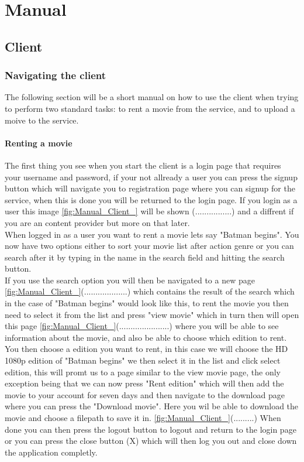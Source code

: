 \chapter{Manual}
\label{Manual}

\section{Client}
\label{Manual_Client}

\subsection{Navigating the client}
\label{Manual_Client_Navigation}
The following section will be a short manual on how to use the client when trying to perform two standard tasks: to rent a movie from the service, and to upload a moive to the service.

\subsubsection{Renting a movie}
\label{Manual_Client_Navigation_Rent}
The first thing you see when you start the client is a login page that requires your username and password, if your not allready a user you can press the signup button which will navigate you to registration page where you can signup for the service, when this is done you will be returned to the login page. If you login as a user this image \ref{fig:Manual_Client_} will be shown (................) and a diffrent if you are an content provider but more on that later.
\\When logged in as a user you want to rent a movie lets say "Batman begins". You now have two options either to sort your movie list after action genre or you can search after it by typing in the name in the search field and hitting the search button.
\\If you use the search option you will then be navigated to a new page \ref{fig:Manual_Client_}(...................) which contains the result of the search which in the case of "Batman begins" would look like this, to rent the movie you then need to select it from the list and press "view movie" which in turn then will open this page \ref{fig:Manual_Client_}(......................) where you will be able to see information about the movie, and also be able to choose which edition to rent.
\\ You then choose a edition you want to rent, in this case we will choose the HD 1080p edition of "Batman begins" we then select it in the list and click select edition, this will promt us to a page similar to the view movie page, the only exception being that we can now press "Rent edition" which will then add the movie to your account for seven days and then navigate to the download page where you can press the "Download movie". Here you wil be able to download the movie and choose a filepath to save it in. \ref{fig:Manual_Client_}(.........) When done you can then press the logout button to logout and return to the login page or you can press the close button (X) which will then log you out and close down the application completly.

